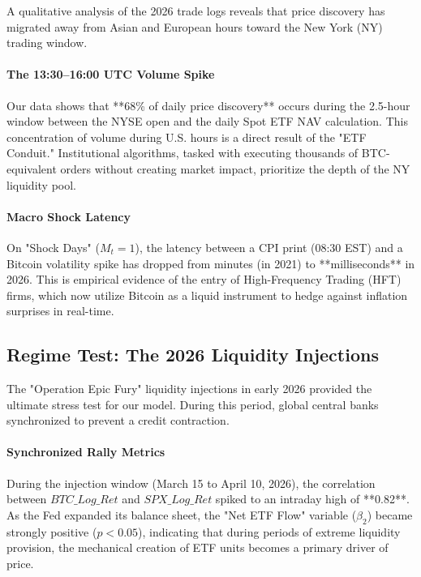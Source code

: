 \documentclass[10pt, conference, compsocconf]{IEEEtran}
\begin{document}
A qualitative analysis of the 2026 trade logs reveals that price discovery has migrated away from Asian and European hours toward the New York (NY) trading window.

\paragraph{The 13:30--16:00 UTC Volume Spike}
Our data shows that **68\% of daily price discovery** occurs during the 2.5-hour window between the NYSE open and the daily Spot ETF NAV calculation. This concentration of volume during U.S. hours is a direct result of the "ETF Conduit." Institutional algorithms, tasked with executing thousands of BTC-equivalent orders without creating market impact, prioritize the depth of the NY liquidity pool.

\paragraph{Macro Shock Latency}
On "Shock Days" ($M_t=1$), the latency between a CPI print (08:30 EST) and a Bitcoin volatility spike has dropped from minutes (in 2021) to **milliseconds** in 2026. This is empirical evidence of the entry of High-Frequency Trading (HFT) firms, which now utilize Bitcoin as a liquid instrument to hedge against inflation surprises in real-time.


\subsection{Regime Test: The 2026 Liquidity Injections}

The "Operation Epic Fury" liquidity injections in early 2026 provided the ultimate stress test for our model. During this period, global central banks synchronized to prevent a credit contraction.

\paragraph{Synchronized Rally Metrics}
During the injection window (March 15 to April 10, 2026), the correlation between $BTC\_Log\_Ret$ and $SPX\_Log\_Ret$ spiked to an intraday high of **0.82**. As the Fed expanded its balance sheet, the "Net ETF Flow" variable ($\beta_2$) became strongly positive ($p < 0.05$), indicating that during periods of extreme liquidity provision, the mechanical creation of ETF units becomes a primary driver of price.
\end{document}
